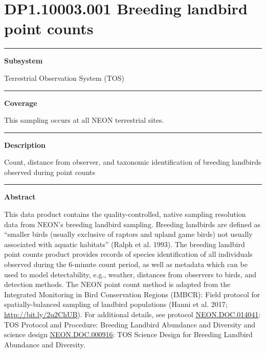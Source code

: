 \documentclass[]{article}
\begin{document}
\section{DP1.10003.001 Breeding landbird point
counts}\label{dp1.10003.001-breeding-landbird-point-counts}

\begin{center}\rule{0.5\linewidth}{\linethickness}\end{center}

\textbf{Subsystem}

Terrestrial Observation System (TOS)

\begin{center}\rule{0.5\linewidth}{\linethickness}\end{center}

\textbf{Coverage}

This sampling occurs at all NEON terrestrial sites.

\begin{center}\rule{0.5\linewidth}{\linethickness}\end{center}

\textbf{Description}

Count, distance from observer, and taxonomic identification of breeding
landbirds observed during point counts

\begin{center}\rule{0.5\linewidth}{\linethickness}\end{center}

\textbf{Abstract}

This data product contains the quality-controlled, native sampling
resolution data from NEON's breeding landbird sampling. Breeding
landbirds are defined as ``smaller birds (usually exclusive of raptors
and upland game birds) not usually associated with aquatic habitats''
(Ralph et al. 1993). The breeding landbird point counts product provides
records of species identification of all individuals observed during the
6-minute count period, as well as metadata which can be used to model
detectability, e.g., weather, distances from observers to birds, and
detection methods. The NEON point count method is adapted from the
Integrated Monitoring in Bird Conservation Regions (IMBCR): Field
protocol for spatially-balanced sampling of landbird populations (Hanni
et al. 2017; \url{http://bit.ly/2u2ChUB}). For additional details, see
protocol
\href{http://data.neonscience.org/api/v0/documents/NEON.DOC.014041vF}{NEON.DOC.014041}:
TOS Protocol and Procedure: Breeding Landbird Abundance and Diversity
and science design
\href{http://data.neonscience.org/api/v0/documents/NEON.DOC.000916vB}{NEON.DOC.000916}:
TOS Science Design for Breeding Landbird Abundance and Diversity.
\end{document}

